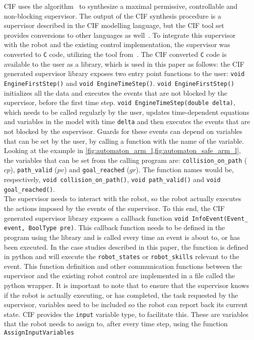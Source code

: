 CIF uses the algorithm~\cite{CIF_algo} to synthesize a maximal permissive, controllable and non-blocking supervisor.
The output of the CIF synthesis procedure is a supervisor described in the CIF modelling language, but the CIF tool set provides conversions to other languages as well~\cite{cif3_c99}.
To integrate this supervisor with the robot and the existing control implementation, the supervisor was converted to \texttt{C} code, utilizing the tool from~\cite{cif3_c99}.
The CIF converted \texttt{C} code is available to the user as a library, which is used in this paper as follows:
the CIF generated supervisor library exposes two entry point functions to the user: \texttt{void EngineFirstStep()} and \texttt{void EngineTimeStep()}.
\texttt{void EngineFirstStep()} initializes all the data and executes the events that are not blocked by the supervisor, before the first time step.
\texttt{void EngineTimeStep(double delta)}, which needs to be called regularly by the user, updates time-dependent equations and variables in the model with time \texttt{delta} and then executes the events that are not blocked by the supervisor.
Guards for these events can depend on variables that can be set by the user, by calling a function with the name of the variable.
Looking at the example in \cref{fig:automaton_arm_l,fig:automaton_safe_arm_l}, the variables that can be set from the calling program are: \texttt{collision\_on\_path} (\(cp\)), \texttt{path\_valid} (\(pv\)) and \texttt{goal\_reached} (\(gr\)).
The function names would be, respectively, \texttt{void collision\_on\_path()}, \texttt{void path\_valid()} and \texttt{void goal\_reached()}.\\
The supervisor needs to interact with the robot, so the robot actually executes the actions imposed by the events of the supervisor.
To this end, the CIF generated supervisor library exposes a callback function \texttt{void InfoEvent(Event\_ event, BoolType pre)}.
This callback function needs to be defined in the program using the library and is called every time an event is about to, or has been executed.
In the case studies described in this paper, the function is defined in python and will execute the \texttt{robot\_states} or \texttt{robot\_skills} relevant to the event.
This function definition and other communication functions between the supervisor and the existing robot control are implemented in a file called the python wrapper.
It is important to note that to ensure that the supervisor knows if the robot is actually executing, or has completed, the task requested by the supervisor, variables need to be included so the robot can report back its current state.
CIF provides the \texttt{input} variable type, to facilitate this.
These are variables that the robot needs to assign to, after every time step, using the function \texttt{AssignInputVariables}\\
 
